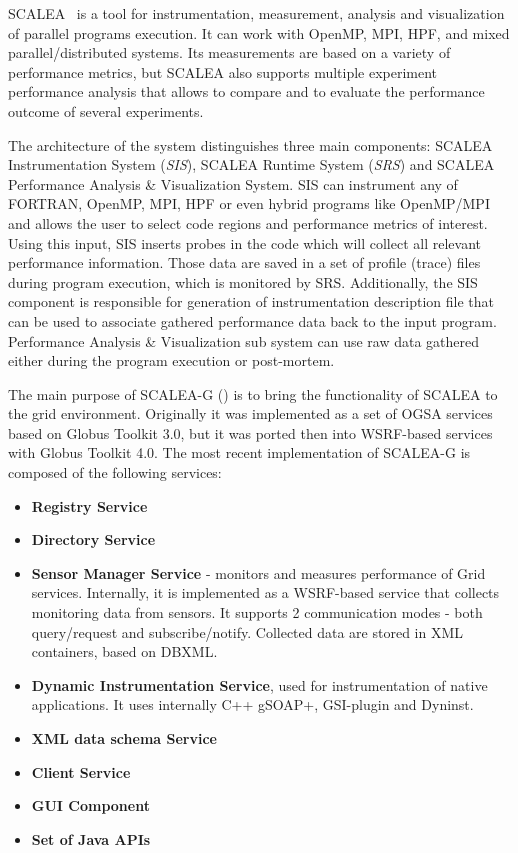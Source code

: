 SCALEA~\cite{SCALEA1} is a tool for instrumentation, measurement, analysis and visualization of parallel programs execution. It can work with OpenMP, MPI, HPF, and mixed parallel/distributed systems. Its measurements are based on a variety of performance metrics, but SCALEA also supports multiple experiment performance analysis that allows to compare and to evaluate the performance outcome of several experiments.

The architecture of the system distinguishes three main components: SCALEA Instrumentation System (\emph{SIS}), SCALEA Runtime System (\emph{SRS}) and SCALEA Performance Analysis \& Visualization System. SIS can instrument any of FORTRAN, OpenMP, MPI, HPF or even hybrid programs like OpenMP/MPI and allows the user to select code regions and performance metrics of interest. Using this input, SIS inserts probes in the code which will collect all relevant performance information. Those data are saved in a set of profile (trace) files during program execution, which is monitored by SRS. Additionally, the SIS component is responsible for generation of instrumentation description file that can be used to associate gathered performance data back to the input program. Performance Analysis \& Visualization sub system can use raw data gathered either during the program execution or post-mortem.

The main purpose of SCALEA-G (\cite{SCALEA2, SCALEA3}) is to bring the functionality of SCALEA to the grid environment. Originally it was implemented as a set of OGSA services based on Globus Toolkit 3.0, but it was ported then into WSRF-based services with Globus Toolkit 4.0. The most recent implementation of SCALEA-G is composed of the following services:

\begin{itemize}

\item{ {\bf Registry Service}}

\item{ {\bf Directory Service}}

\item{ {\bf Sensor Manager Service} - monitors and measures performance of Grid services. Internally, it is implemented as a WSRF-based service that collects monitoring data from sensors. It supports 2 communication modes - both query/request and subscribe/notify. Collected data are stored in XML containers, based on DBXML.}

\item{ {\bf Dynamic Instrumentation Service}, used for instrumentation of native applications. It uses internally C++ gSOAP+, GSI-plugin and Dyninst.}

\item{ {\bf XML data schema Service}}

\item{ {\bf Client Service}}

\item{ {\bf GUI Component}}

\item{ {\bf Set of Java APIs}}

\end{itemize}

